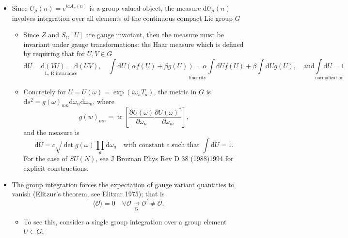\begin{itemize}
  \item Since \(U_{\mu}(n)=e^{ia A_{\mu}(n)}\) is a group valued object, the measure \(\text{d} U_{\mu}(n)\) involves integration over all elements of the continuous compact Lie group \(G\)
  \begin{itemize}
        \item Since \(Z\) and \(S_{G}[U]\) are gauge invariant, then the measure must be invariant under gauge transformations: the Haar measure which is defined by requiring that for \(U, V \in G\)
        \begin{equation}
            \underset{\text{L, R invariance}}{\text{d}U = \text{d}(V U) = \text{d}(UV)}, \underset{\text{linearity}}{\quad \int \text{d}U(\alpha f(U) + \beta g(U)) = \alpha \int \text{d}U f(U) + \beta \int \text{d}U g(U)}, \quad \text{and} \underset{\text{normalization}}{\int \text{d}U = 1}
        \end{equation}
        \item Concretely for $U = U(\omega) = \exp(i \omega_a T_a)$, the metric in $G$ is $\text{d}s^2 = g(\omega)_{mn} \text{d}\omega_n \text{d}\omega_m$, where
        \begin{equation}
            g(w)_{mn} = \operatorname{tr}\left[ \frac{\partial U(\omega)}{\partial \omega_n}\frac{\partial U(\omega)^\dagger}{\partial \omega_m}\right],
        \end{equation}
        and the measure is
        \begin{equation}
            \text{d} U = c \sqrt{\operatorname{det}g(\omega)}\prod_a \text{d}\omega_a \quad \text{with constant $c$ such that $\int \text{d}U = 1$}.
        \end{equation}
        For the case of $SU(N)$, see J Broznan Phys Rev D 38 (1988)1994 for explicit constructions. 
  \end{itemize}
  \item The group integration forces the expectation of gauge variant quantities to vanish (Elitzur's theorem, see Elitzur 1975); that is
  \begin{equation}
      \langle \mathcal{O} \rangle = 0 \quad \forall\mathcal{O} \underset{G}{\rightarrow} \mathcal{O}^\prime \neq \mathcal{O}.
  \end{equation}
  \begin{itemize}
      \item To see this, consider a single group integration over a group element $U \in G$:

\end{itemize}
\end{itemize}

